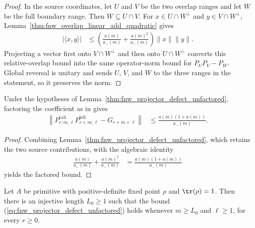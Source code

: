 \begin{proof}
    \leanok
    In the source coordinates, let $U$ and $V$ be the two overlap ranges and
    let $W$ be the full boundary range. Then $W\subseteq U\cap V$. For
    $x\in U\cap W^\perp$ and $y\in V\cap W^\perp$,
    Lemma~\ref{thm:fnw_overlap_linear_add_quadratic} gives
    \begin{align}
        |\langle x,y\rangle|
         & \leq\left(\frac{a(m)}{a_-(m)}
        +\frac{a(m)^2}{a_-(m)}\right)\lVert x\rVert\lVert y\rVert.
    \end{align}
    Projecting a vector first onto $V\cap W^\perp$ and then onto
    $U\cap W^\perp$ converts this relative-overlap bound into the same
    operator-norm bound for $P_UP_V-P_W$. Global reversal is unitary and sends
    $U$, $V$, and $W$ to the three ranges in the statement, so it preserves
    the norm.
\end{proof}

\begin{lemma}
    \label{thm:fnw_projector_defect_factored}
    \leanok
    Under the hypotheses of
    Lemma~\ref{thm:fnw_projector_defect_unfactored}, factoring the
    coefficient as in \cite[Lemma~6.2]{Fannes1992Finitely} gives
    \begin{align}
        \left\lVert
        P^{\mathrm{tail}}_{r;m,\ell}P^{\mathrm{left}}_{r+m;\ell}
        -G_{r+m+\ell}
        \right\rVert
         & \leq \frac{a(m)(1+a(m))}{a_-(m)}.
        \label{eq:fnw_projector_defect_factored}
    \end{align}
\end{lemma}

\begin{proof}
    \leanok
    Combining Lemma~\ref{thm:fnw_projector_defect_unfactored}, which retains
    the two source contributions, with the algebraic identity
    \begin{align}
        \frac{a(m)}{a_-(m)}+\frac{a(m)^2}{a_-(m)}
         & =\frac{a(m)(1+a(m))}{a_-(m)}
    \end{align}
    yields the factored bound.
\end{proof}

\begin{lemma}
    \label{thm:primitive_fnw_projector_defect}
    \leanok
    Let $A$ be primitive with positive-definite fixed point $\rho$ and
    $\tr(\rho)=1$. Then there is an injective length $L_0\geq1$ such that
    the bound (\ref{eq:fnw_projector_defect_unfactored}) holds whenever
    $m\geq L_0$ and $\ell\geq1$, for every $r\geq0$.
\end{lemma}

